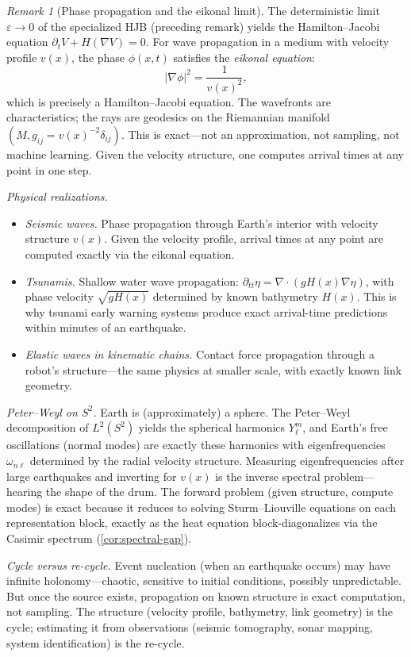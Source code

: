 \documentclass[12pt]{amsart}
\theoremstyle{definition}
\theoremstyle{remark}
\newtheorem*{remark}{Remark}
\begin{document}
\begin{remark}[Phase propagation and the eikonal limit]\label{rem:eikonal}
The deterministic limit $\varepsilon \to 0$ of the specialized HJB (preceding remark) yields the Hamilton--Jacobi equation $\partial_t V + H(\nabla V) = 0$. For wave propagation in a medium with velocity profile $v(x)$, the phase $\phi(x,t)$ satisfies the \emph{eikonal equation}:
\[
|\nabla\phi|^2 = \frac{1}{v(x)^2},
\]
which is precisely a Hamilton--Jacobi equation. The wavefronts are characteristics; the rays are geodesics on the Riemannian manifold $(M, g_{ij} = v(x)^{-2}\delta_{ij})$. This is exact---not an approximation, not sampling, not machine learning. Given the velocity structure, one computes arrival times at any point in one step.

\emph{Physical realizations.}
\begin{itemize}
\item \emph{Seismic waves.} Phase propagation through Earth's interior with velocity structure $v(x)$. Given the velocity profile, arrival times at any point are computed exactly via the eikonal equation.
\item \emph{Tsunamis.} Shallow water wave propagation: $\partial_{tt}\eta = \nabla\cdot(gH(x)\nabla\eta)$, with phase velocity $\sqrt{gH(x)}$ determined by known bathymetry $H(x)$. This is why tsunami early warning systems produce exact arrival-time predictions within minutes of an earthquake.
\item \emph{Elastic waves in kinematic chains.} Contact force propagation through a robot's structure---the same physics at smaller scale, with exactly known link geometry.
\end{itemize}

\emph{Peter--Weyl on $S^2$.}
Earth is (approximately) a sphere. The Peter--Weyl decomposition of $L^2(S^2)$ yields the spherical harmonics $Y_\ell^m$, and Earth's free oscillations (normal modes) are exactly these harmonics with eigenfrequencies $\omega_{n\ell}$ determined by the radial velocity structure. Measuring eigenfrequencies after large earthquakes and inverting for $v(x)$ is the inverse spectral problem---hearing the shape of the drum. The forward problem (given structure, compute modes) is exact because it reduces to solving Sturm--Liouville equations on each representation block, exactly as the heat equation block-diagonalizes via the Casimir spectrum (\cref{cor:spectral-gap}).

\emph{Cycle versus re-cycle.}
Event nucleation (when an earthquake occurs) may have infinite holonomy---chaotic, sensitive to initial conditions, possibly unpredictable. But once the source exists, propagation on known structure is exact computation, not sampling. The structure (velocity profile, bathymetry, link geometry) is the cycle; estimating it from observations (seismic tomography, sonar mapping, system identification) is the re-cycle.
\end{remark}
\end{document}
